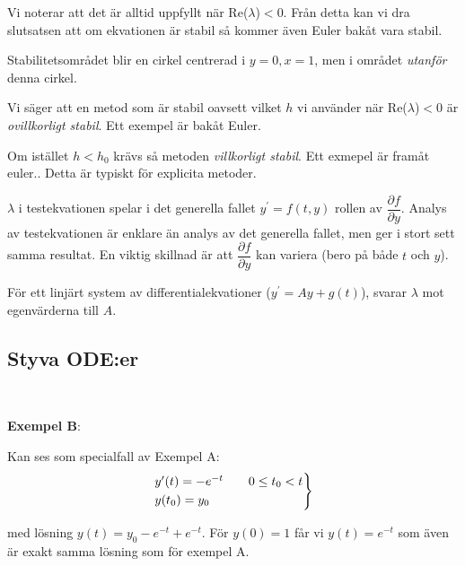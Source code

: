 \par\bigskip
\noindent Vi noterar att det är alltid uppfyllt när Re($\lambda$)$<$0. Från detta kan vi dra slutsatsen att om ekvationen är stabil så kommer även Euler bakåt vara stabil.
\par\bigskip
\noindent Stabilitetsområdet blir en cirkel centrerad i $y=0, x=1$, men i området \textit{utanför} denna cirkel.
\par\bigskip
\noindent Vi säger att en metod som är stabil oavsett vilket $h$ vi använder när Re($\lambda$)$<$0 är \textit{ovillkorligt stabil}. Ett exempel är bakåt Euler.
\par\bigskip
\noindent Om istället $h<h_0$ krävs så metoden \textit{villkorligt stabil}. Ett exmepel är framåt euler.. Detta är typiskt för explicita metoder.
\par\bigskip
\noindent $\lambda$ i testekvationen spelar i det generella fallet $y^{\prime} = f(t,y)$ rollen av $\dfrac{\partial f}{\partial y}$. Analys av testekvationen är enklare än analys av det generella fallet, men ger i stort sett samma resultat. En viktig skillnad är att $\dfrac{\partial f}{\partial y}$ kan variera (bero på både $t$ och $y$).\par
\noindent För ett linjärt system av differentialekvationer ($y^{\prime} = Ay + g(t)$), svarar $\lambda$ mot egenvärderna till $A$.
\par\bigskip
\subsection{Styva ODE:er}\hfill\\
\par\bigskip
\noindent \textbf{Exempel B}:
\par\bigskip
\noindent Kan ses som specialfall av Exempel A:
\begin{equation*}
  \begin{gathered}
    \begin{rcases*}
      y^{\prime}(t) = -e^{-t}\qquad0\leq t_0 < t\\
      y(t_0) = y_0
    \end{rcases*}
  \end{gathered}
\end{equation*}\par
\noindent med lösning $y(t) = y_0-e^{-t}+e^{-t}$. För $y(0)=1$ får vi $y(t) = e^{-t}$ som även är exakt samma lösning som för exempel A.
\par\bigskip

